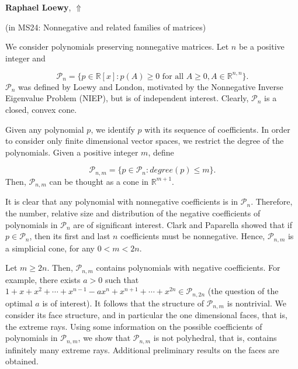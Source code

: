 \documentclass[ILAS2025-program.tex]{subfiles}
\begin{document}
\hypertarget{down0354}{}\begin{ilasabstract}
    
\textbf{Raphael Loewy},  \hfill \hyperlink{up0354}{$\Uparrow$}
    
    
(in {\color{mstitle}MS24: Nonnegative and related families of matrices})
        
\mtskip
    We consider polynomials preserving nonnegative matrices. Let $n$ be a positive integer and

\begin{equation*}
{\mathcal{P}}_{n}=\{p \in {{\mathbb{R}}}[x]: p(A)\geq 0 \mbox{ for all~}  A \geq 0, A \in {\mathbb{R}}^{n,n}\}.
\end{equation*}
${\mathcal{P}}_{n}$ was defined by Loewy and London, motivated by the Nonnegative Inverse Eigenvalue Problem (NIEP), but is of independent interest. Clearly, ${\mathcal{P}}_{n}$ is a closed, convex cone.

\medskip
Given any polynomial $p$, we identify $p$ with its sequence of coefficients. In order to consider only finite dimensional vector spaces, we restrict the degree of the polynomials. Given a positive integer $m$, define

\begin{equation*}
{\mathcal{P}}_{n,m}=\{p \in {\mathcal{P}}_{n} : degree(p) \leq m \}.
\end{equation*}
Then, ${\mathcal{P}}_{n,m}$ can be thought as a cone in ${\mathbb{R}}^{m+1}$.

\medskip
It is clear that any polynomial with nonnegative coefficients is in ${\mathcal{P}}_{n}$. Therefore, the number, relative size and distribution of the negative coefficients of polynomials in ${\mathcal{P}}_{n}$ are of significant interest. Clark and Paparella showed that if $p \in {\mathcal{P}}_{n}$, then its first and last $n$ coefficients must be nonnegative. Hence, ${\mathcal{P}}_{n,m}$ is a simplicial cone, for any $0 < m <2n$.

\medskip
Let $m \geq 2n$. Then, ${\mathcal{P}}_{n,m}$ contains polynomials with negative coefficients. For example, there exists $a > 0$ such that $1+x+x^{2}+\cdots+x^{n-1}-ax^{n}+x^{n+1}+\cdots+x^{2n} \in {\mathcal{P}}_{n,2n}$ (the question of the optimal $a$ is of interest).
It follows that the structure of ${\mathcal{P}}_{n,m}$ is nontrivial. We consider its face structure, and in particular the one dimensional faces, that is, the extreme rays. Using some information on the possible coefficients of polynomials in  ${\mathcal{P}}_{n,m}$, we show that  ${\mathcal{P}}_{n,m}$ is not polyhedral, that is, contains infinitely many extreme rays. Additional preliminary results on the faces are obtained.
\end{ilasabstract}
    
\end{document}
